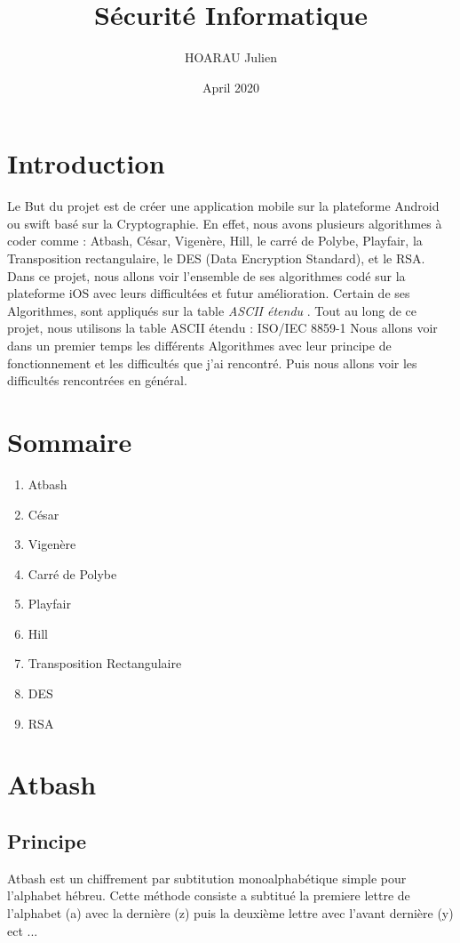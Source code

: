\documentclass{article}
\title{Sécurité Informatique}
\author{HOARAU Julien }
\date{April 2020}
\begin{document}
\maketitle

\section{Introduction}
Le But du projet est de créer une application mobile sur la plateforme Android ou swift basé sur la Cryptographie. En effet, nous avons plusieurs algorithmes à coder comme : Atbash, César, Vigenère, Hill, le carré de Polybe, Playfair, la Transposition rectangulaire, le DES (Data Encryption Standard), et le RSA.
Dans ce projet, nous allons voir l'ensemble de ses algorithmes codé sur la plateforme iOS avec leurs difficultées et futur amélioration.
Certain de ses Algorithmes, sont appliqués sur la table \textit{ASCII étendu} .\newline
Tout au long de ce projet, nous utilisons la table ASCII étendu : ISO/IEC 8859-1
Nous allons voir dans un premier temps les différents Algorithmes avec leur principe de fonctionnement et les difficultés que j'ai rencontré.
Puis nous allons voir les difficultés rencontrées en général.


\section{Sommaire}
\begin{enumerate}
\item Atbash
\item César
\item Vigenère 
\item Carré de Polybe
\item Playfair
\item Hill
\item Transposition Rectangulaire
\item DES
\item RSA
\end{enumerate}
\newpage
\section{Atbash}
\subsection{Principe}
Atbash est un chiffrement par subtitution monoalphabétique simple pour l'alphabet hébreu. Cette méthode consiste a subtitué la premiere lettre de l'alphabet (a) avec la dernière (z) puis la deuxième lettre avec l'avant dernière (y) ect ...
\end{document}
